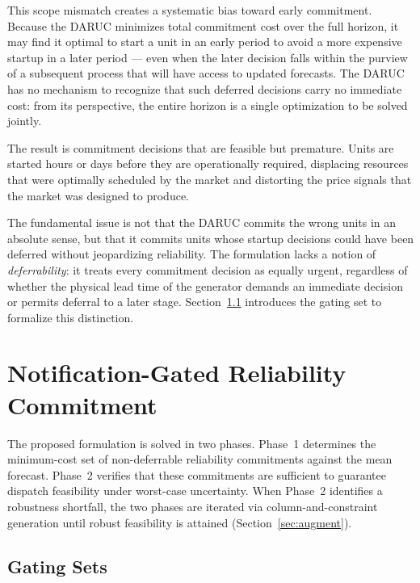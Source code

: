 \documentclass[journal]{IEEEtran}
\begin{document}
This scope mismatch creates a systematic bias toward early
commitment.
Because the DARUC minimizes total commitment cost over the full
horizon, it may find it optimal to start a unit in an early period
to avoid a more expensive startup in a later period --- even when
the later decision falls within the purview of a subsequent process
that will have access to updated forecasts.
The DARUC has no mechanism to recognize that such deferred decisions
carry no immediate cost: from its perspective, the entire horizon
is a single optimization to be solved jointly.

The result is commitment decisions that are feasible but premature.
Units are started hours or days before they are operationally
required, displacing resources that were optimally scheduled by the
market and distorting the price signals that the market was designed
to produce.

The fundamental issue is not that the DARUC commits the wrong units
in an absolute sense, but that it commits units whose startup
decisions could have been deferred without jeopardizing reliability.
The formulation lacks a notion of \emph{deferrability}: it treats
every commitment decision as equally urgent, regardless of whether
the physical lead time of the generator demands an immediate
decision or permits deferral to a later stage.
Section~\ref{sec:gating} introduces the gating set to formalize
this distinction.


\section{Notification-Gated Reliability Commitment}

The proposed formulation is solved in two phases.
Phase~1 determines the minimum-cost set of non-deferrable reliability
commitments against the mean forecast.
Phase~2 verifies that these commitments are sufficient to guarantee
dispatch feasibility under worst-case uncertainty.
When Phase~2 identifies a robustness shortfall, the two phases are
iterated via column-and-constraint generation until robust feasibility
is attained (Section~\ref{sec:augment}).

\subsection{Gating Sets}\label{sec:gating}
\end{document}
